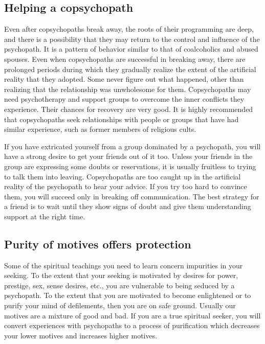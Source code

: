 \documentclass[a5paper,10pt,english]{book}
\begin{document}
\subsection{Helping a co\sphinxhyphen{}psychopath}
\label{\detokenize{psychopaths:helping-a-co-psychopath}}
\sphinxAtStartPar
Even after co\sphinxhyphen{}psychopaths break away, the roots of their programming are
deep, and there is a possibility that they may return to the control and
influence of the psychopath. It is a pattern of behavior similar to that
of co\sphinxhyphen{}alcoholics and abused spouses. Even when co\sphinxhyphen{}psychopaths are
successful in breaking away, there are prolonged periods during which
they gradually realize the extent of the artificial reality that they
adopted. Some never figure out what happened, other than realizing that
the relationship was unwholesome for them. Co\sphinxhyphen{}psychopaths may need
psychotherapy and support groups to overcome the inner conflicts they
experience. Their chances for recovery are very good. It is highly
recommended that co\sphinxhyphen{}psychopaths seek relationships with people or groups
that have had similar experience, such as former members of religious
cults.

\sphinxAtStartPar
If you have extricated yourself from a group dominated by a psychopath,
you will have a strong desire to get your friends out of it too. Unless
your friends in the group are expressing some doubts or reservations, it
is usually fruitless to trying to talk them into leaving. Co\sphinxhyphen{}psychopaths
are too caught up in the artificial reality of the psychopath to hear
your advice. If you try too hard to convince them, you will succeed only
in breaking off communication. The best strategy for a friend is to wait
until they show signs of doubt and give them understanding support at
the right time.


\subsection{Purity of motives offers protection}
\label{\detokenize{psychopaths:purity-of-motives-offers-protection}}
\sphinxAtStartPar
Some of the spiritual teachings you need to learn concern impurities in
your seeking. To the extent that your seeking is motivated by desires
for power, prestige, sex, sense desires, etc., you are vulnerable to
being seduced by a psychopath. To the extent that you are motivated to
become enlightened or to purify your mind of defilements, then you are
on safe ground. Usually our motives are a mixture of good and bad. If
you are a true spiritual seeker, you will convert experiences with
psychopaths to a process of purification which decreases your lower
motives and increases higher motives.
\end{document}
